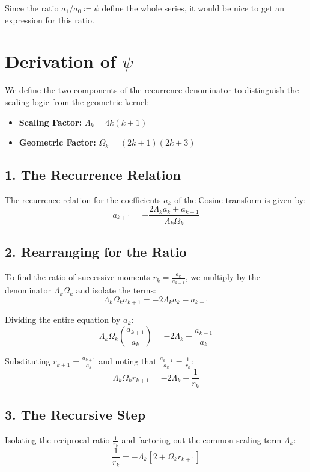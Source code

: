 \documentclass[11pt]{article}
\theoremstyle{breakdef}
\begin{document}
Since the ratio $a_1/a_0 \coloneq \psi$ define the whole series, it would be nice to get an expression for this ratio.

\section*{Derivation of $\psi$}

We define the two components of the recurrence denominator to distinguish the scaling logic from the geometric kernel:
\begin{itemize}
    \item \textbf{Scaling Factor:} $\Lambda_k = 4k(k+1)$
    \item \textbf{Geometric Factor:} $\Omega_k = (2k+1)(2k+3)$
\end{itemize}

\subsection*{1. The Recurrence Relation}
The recurrence relation for the coefficients $a_k$ of the Cosine transform is given by:
\begin{equation}
    a_{k+1} = - \frac{2\Lambda_k a_k + a_{k-1}}{\Lambda_k \Omega_k}
\end{equation}

\subsection*{2. Rearranging for the Ratio}
To find the ratio of successive moments $r_k = \frac{a_k}{a_{k-1}}$, we multiply by the denominator $\Lambda_k \Omega_k$ and isolate the terms:
\begin{equation}
    \Lambda_k \Omega_k a_{k+1} = -2\Lambda_k a_k - a_{k-1}
\end{equation}

Dividing the entire equation by $a_k$:
\begin{equation}
    \Lambda_k \Omega_k \left( \frac{a_{k+1}}{a_k} \right) = -2\Lambda_k - \frac{a_{k-1}}{a_k}
\end{equation}

Substituting $r_{k+1} = \frac{a_{k+1}}{a_k}$ and noting that $\frac{a_{k-1}}{a_k} = \frac{1}{r_k}$:
\begin{equation}
    \Lambda_k \Omega_k r_{k+1} = -2\Lambda_k - \frac{1}{r_k}
\end{equation}

\subsection*{3. The Recursive Step}
Isolating the reciprocal ratio $\frac{1}{r_k}$ and factoring out the common scaling term $\Lambda_k$:
\begin{equation}
    \frac{1}{r_k} = -\Lambda_k \left[ 2 + \Omega_k r_{k+1} \right]
\end{equation}
\end{document}

